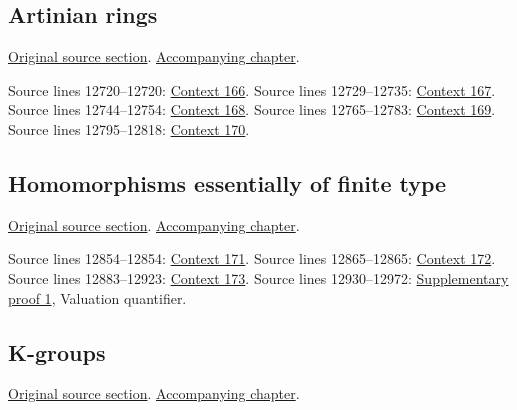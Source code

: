 \subsection{Artinian rings}
\hypertarget{algebra-source-section-artinian}{}
\noindent\href{https://github.com/stacks/stacks-project/blob/a04446e57ec1fbc252a871afcec7752fb2807b14/algebra.tex\#L12699}{Original source section}. \href{algebra.pdf\#nameddest=section-artinian}{Accompanying chapter}.

\begin{AlgebraSourceRoutes}
 Source lines 12720--12720: \hyperlink{algebra-context-166}{Context 166}.
 Source lines 12729--12735: \hyperlink{algebra-context-167}{Context 167}.
 Source lines 12744--12754: \hyperlink{algebra-context-168}{Context 168}.
 Source lines 12765--12783: \hyperlink{algebra-context-169}{Context 169}.
 Source lines 12795--12818: \hyperlink{algebra-context-170}{Context 170}.
\end{AlgebraSourceRoutes}

\subsection{Homomorphisms essentially of finite type}
\hypertarget{algebra-source-section-essentially-of-finite-type}{}
\noindent\href{https://github.com/stacks/stacks-project/blob/a04446e57ec1fbc252a871afcec7752fb2807b14/algebra.tex\#L12829}{Original source section}. \href{algebra.pdf\#nameddest=section-essentially-of-finite-type}{Accompanying chapter}.

\begin{AlgebraSourceRoutes}
 Source lines 12854--12854: \hyperlink{algebra-context-171}{Context 171}.
 Source lines 12865--12865: \hyperlink{algebra-context-172}{Context 172}.
 Source lines 12883--12923: \hyperlink{algebra-context-173}{Context 173}.
 Source lines 12930--12972: \hyperlink{algebra_localization_kgroups_graded_notes_20260927}{Supplementary proof 1}, Valuation quantifier.
\end{AlgebraSourceRoutes}

\subsection{K-groups}
\hypertarget{algebra-source-section-K-groups}{}
\noindent\href{https://github.com/stacks/stacks-project/blob/a04446e57ec1fbc252a871afcec7752fb2807b14/algebra.tex\#L12995}{Original source section}. \href{algebra.pdf\#nameddest=section-K-groups}{Accompanying chapter}.

